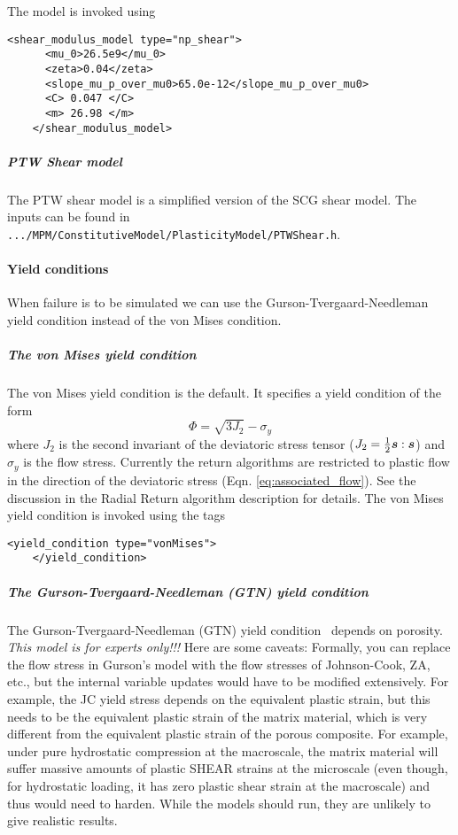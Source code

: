   The model is invoked using
  \begin{Verbatim}[fontsize=\footnotesize]
    <shear_modulus_model type="np_shear">
      <mu_0>26.5e9</mu_0>
      <zeta>0.04</zeta>
      <slope_mu_p_over_mu0>65.0e-12</slope_mu_p_over_mu0>
      <C> 0.047 </C>
      <m> 26.98 </m>
    </shear_modulus_model>
  \end{Verbatim}

  \subparagraph{PTW Shear model}
  The PTW shear model is a simplified version of the SCG shear model.
  The inputs can be found in \verb|.../MPM/ConstitutiveModel/PlasticityModel/PTWShear.h|.

\paragraph{Yield conditions}
When failure is to be simulated we can use the
Gurson-Tvergaard-Needleman yield condition instead of the von Mises
condition.

  \subparagraph{The von Mises yield condition}
  The von Mises yield condition is the default.  It specifies a yield condition of
  the form
  \begin{equation}
    \Phi = \sqrt{3J_2} - \sigma_y
  \end{equation}
  where $J_2$ is the second invariant of the deviatoric stress tensor
  ($J_2={1\over2}\Bs:\Bs$) and $\sigma_y$ is the flow stress. Currently
  the return algorithms are restricted to plastic flow in the
  direction of the deviatoric stress
  (Eqn. \ref{eq:associated_flow}). See the discussion in the Radial
  Return algorithm description for details.  The von Mises yield
  condition is invoked using the tags
  \begin{Verbatim}[fontsize=\footnotesize]
    <yield_condition type="vonMises">
    </yield_condition>
  \end{Verbatim}

  \subparagraph{The Gurson-Tvergaard-Needleman (GTN) yield condition}
  The Gurson-Tvergaard-Needleman (GTN) yield
  condition~\cite{Gurson77,Tver84} depends on porosity.  {\it This
  model is for experts only!!!}  Here are some caveats: Formally,
  you can replace the flow stress in Gurson’s model with the flow
  stresses of Johnson-Cook, ZA, etc., but the internal variable
  updates would have to be modified extensively.  For example, the JC
  yield stress depends on the equivalent plastic strain, but this
  needs to be the equivalent plastic strain of the matrix material,
  which is very different from the equivalent plastic strain of the
  porous composite. For example, under pure hydrostatic compression at
  the macroscale, the matrix material will suffer massive amounts of
  plastic SHEAR strains at the microscale (even though, for
  hydrostatic loading, it has zero plastic shear strain at the
  macroscale) and thus would need to harden. While the models should
  run, they are unlikely to give realistic results.


